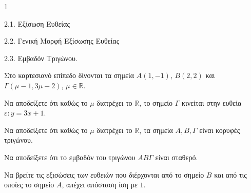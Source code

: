 \begin{ylh}{1}
    \item 2.1. Εξίσωση Ευθείας
    \item 2.2. Γενική Μορφή Εξίσωσης Ευθείας
    \item 2.3. Εμβαδόν Τριγώνου.
\end{ylh}
Στο καρτεσιανό επίπεδο δίνονται τα σημεία $A(1, -1)$, $B(2, 2)$ και $\Gamma(\mu-1, 3\mu-2)$, $\mu\in\mathbb{R}$.
\begin{alist}
\item Να αποδείξετε ότι καθώς το $\mu$ διατρέχει το $\mathbb{R}$, το σημείο $\Gamma$ κινείται στην ευθεία
$\varepsilon: y = 3x + 1$. 
\item Να αποδείξετε ότι καθώς το $\mu$ διατρέχει το $\mathbb{R}$, τα σημεία $A, B, \Gamma$ είναι κορυφές τριγώνου. 
\item Να αποδείξετε ότι το εμβαδόν του τριγώνου $AB\Gamma$ είναι σταθερό. 
\item Να βρείτε τις εξισώσεις των ευθειών που διέρχονται από το σημείο $B$ και από τις
οποίες το σημείο $A$, απέχει απόσταση ίση με $1$. 
\end{alist}